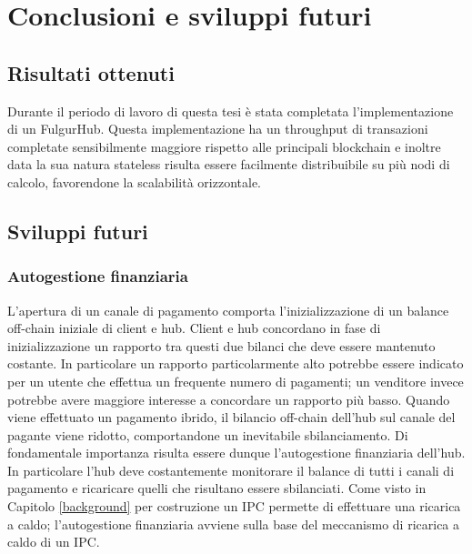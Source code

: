 \documentclass[12pt,italian,]{book}
\begin{document}
\hypertarget{conclusioni-e-sviluppi-futuri}{%
\chapter{Conclusioni e sviluppi futuri}\label{conclusioni-e-sviluppi-futuri}}

\hypertarget{risultati-ottenuti}{%
\section{Risultati ottenuti}\label{risultati-ottenuti}}

Durante il periodo di lavoro di questa tesi è stata completata l'implementazione di un FulgurHub. Questa implementazione ha un throughput di transazioni completate sensibilmente maggiore rispetto alle principali blockchain e inoltre data la sua natura stateless risulta essere facilmente distribuibile su più nodi di calcolo, favorendone la scalabilità orizzontale.

\hypertarget{sviluppi-futuri}{%
\section{Sviluppi futuri}\label{sviluppi-futuri}}

\hypertarget{autogestione-finanziaria}{%
\subsection{Autogestione finanziaria}\label{autogestione-finanziaria}}

L'apertura di un canale di pagamento comporta l'inizializzazione di un balance off-chain iniziale di client e hub. Client e hub concordano in fase di inizializzazione un rapporto tra questi due bilanci che deve essere mantenuto costante. In particolare un rapporto particolarmente alto potrebbe essere indicato per un utente che effettua un frequente numero di pagamenti; un venditore invece potrebbe avere maggiore interesse a concordare un rapporto più basso. Quando viene effettuato un pagamento ibrido, il bilancio off-chain dell'hub sul canale del pagante viene ridotto, comportandone un inevitabile sbilanciamento. Di fondamentale importanza risulta essere dunque l'autogestione finanziaria dell'hub. In particolare l'hub deve costantemente monitorare il balance di tutti i canali di pagamento e ricaricare quelli che risultano essere sbilanciati. Come visto in Capitolo \ref{background} per costruzione un IPC permette di effettuare una ricarica a caldo; l'autogestione finanziaria avviene sulla base del meccanismo di ricarica a caldo di un IPC.
\end{document}
